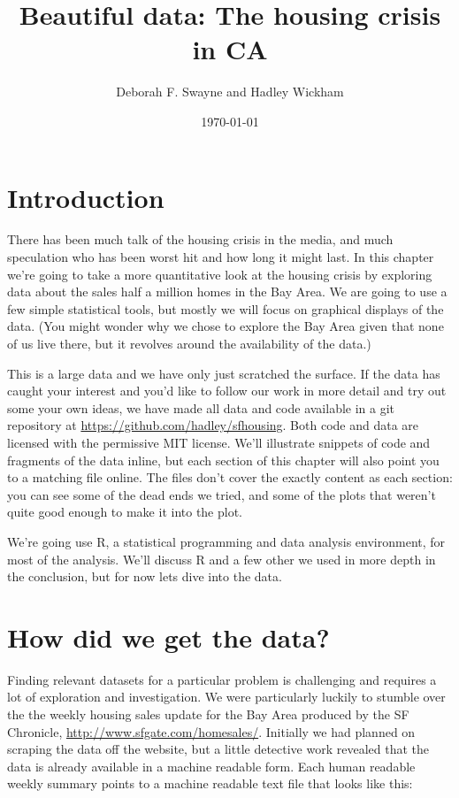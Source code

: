 \documentclass[oneside]{article}
\title{Beautiful data: The housing crisis in CA}
\author{Deborah F. Swayne and Hadley Wickham}
\date{\today}
\begin{document}
\maketitle 

\section{Introduction}

There has been much talk of the housing crisis in the media, and much speculation who has been worst hit and how long it might last.  In this chapter we're going to take a more quantitative look at the housing crisis by exploring data about the sales half a million homes in the Bay Area.  We are going to use a few simple statistical tools, but mostly we will focus on graphical displays of the data.  (You might wonder why we chose to explore the Bay Area given that none of us live there, but it revolves around the availability of the data.)

This is a large data and we have only just scratched the surface.  If the data has caught your interest and you'd like to follow our work in more detail and try out some your own ideas, we have made all data and code available in a git repository at \url{https://github.com/hadley/sfhousing}. Both code and data are licensed with the permissive MIT license.  We'll illustrate snippets of code and fragments of the data inline, but each section of this chapter will also point you to a matching file online.  The files don't cover the exactly content as each section: you can see some of the dead ends we tried, and some of the plots that weren't quite good enough to make it into the plot.  

We're going use R, a statistical programming and data analysis environment, for most of the analysis.  We'll discuss R and a few other we used in more depth in the conclusion, but for now lets dive into the data.

\section{How did we get the data?}

Finding relevant datasets for a particular problem is challenging and requires a lot of exploration and investigation.  We were particularly luckily to stumble over the the weekly housing sales update for the Bay Area produced by the SF Chronicle, \url{http://www.sfgate.com/homesales/}.  Initially we had planned on scraping the data off the website, but a little detective work revealed that the data is already available in a machine readable form.  Each human readable weekly summary points to a machine readable text file that looks like this: 
\end{document}
